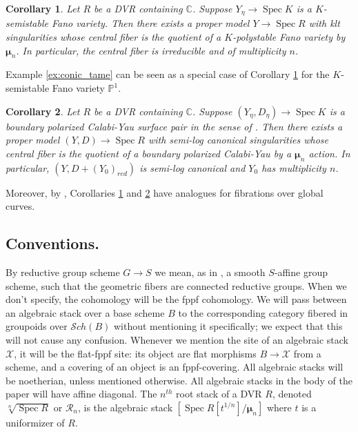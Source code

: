 \documentclass{amsart}
\newtheorem{corollary}[corollary]{Corollary}
\theoremstyle{definition}
\newcommand{\cX}{\mathcal{X}}
\newcommand{\cR}{\mathcal{R}}
\newcommand{\cS}{\mathcal{S}}
\newcommand{\bmu}{\pmb{\mu}}
\newcommand{\spec}{\operatorname{Spec}}
\begin{document}
\begin{corollary}\label{cor:K_moduli}
 Let $R$ be a DVR containing $\mathbb{C}$. Suppose $Y_\eta \to \spec K$ is a $K$-semistable Fano variety. Then there exists a proper model $Y \to \spec R$ with klt singularities whose central fiber is the quotient of a $K$-polystable Fano variety by $\bmu_n$. In particular, the central fiber is irreducible and of multiplicity $n$. 
\end{corollary} 

Example \ref{ex:conic_tame} can be seen as a special case of Corollary \ref{cor:K_moduli} for the $K$-semistable Fano variety $\mathbb{P}^1$. 

\begin{corollary}\label{cor:bpcy_moduli} Let $R$ be a DVR containing $\mathbb{C}$. Suppose $(Y_\eta, D_\eta) \to \spec K$ is a boundary polarized Calabi-Yau surface pair in the sense of \cite{ABBDILW, blum2024goodmodulispacesboundary}. Then there exists a proper model $(Y, D) \to \spec R$ with semi-log canonical singularities whose central fiber is the quotient of a boundary polarized Calabi-Yau by a $\bmu_n$ action. In particular, $(Y,D + (Y_0)_{red})$ is semi-log canonical and $Y_0$ has multiplicity $n$. 
\end{corollary}

Moreover, by , Corollaries \ref{cor:K_moduli} and \ref{cor:bpcy_moduli} have analogues for fibrations over global curves. 

\subsection{Conventions.} By reductive group scheme $G\to S$ we mean, as in \cite[Definition 3.1.1]{ConradReductive},  a smooth $S$-affine group scheme, such that the geometric fibers are connected reductive groups. When we don't specify, the cohomology will be the fppf cohomology.
We will pass between an algebraic stack over a base scheme $B$ to the corresponding category fibered in groupoids over $\cS ch(B)$ without mentioning it specifically; we expect that this will not cause any confusion. Whenever we mention the site of an algebraic stack $\cX$, it will be the flat-fppf site: its object are flat morphisms $B\to \cX$ from a scheme, and a covering of an object is an fppf-covering. All algebraic stacks will be noetherian, unless mentioned otherwise. All algebraic stacks in the body of the paper will have affine diagonal. The $n^{th}$ root stack of a DVR $R$, denoted $\sqrt[n]{\spec R}$ or $\cR_n$, is the algebraic stack $[\spec R[t^{1/n}]/\bmu_n]$ where $t$ is a uniformizer of $R$. 
\end{document}
